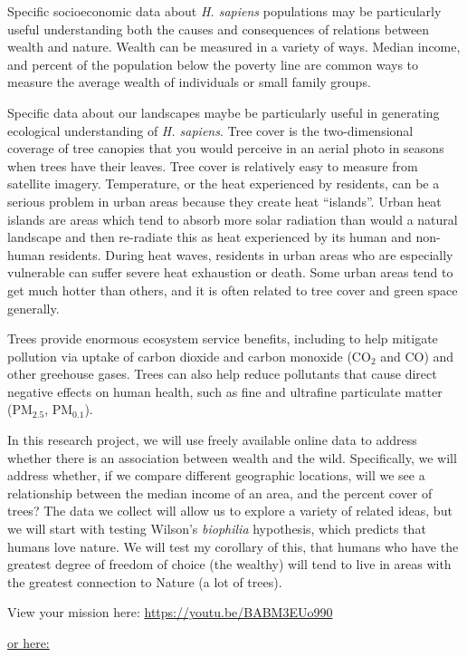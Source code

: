 \documentclass[
  letterpaper,
  DIV=11,
  numbers=noendperiod]{scrreprt}
\begin{document}
Specific socioeconomic data about \emph{H. sapiens} populations may be
particularly useful understanding both the causes and consequences of
relations between wealth and nature. Wealth can be measured in a variety
of ways. Median income, and percent of the population below the poverty
line are common ways to measure the average wealth of individuals or
small family groups.

Specific data about our landscapes maybe be particularly useful in
generating ecological understanding of \emph{H. sapiens}. Tree cover is
the two-dimensional coverage of tree canopies that you would perceive in
an aerial photo in seasons when trees have their leaves. Tree cover is
relatively easy to measure from satellite imagery. Temperature, or the
heat experienced by residents, can be a serious problem in urban areas
because they create heat ``islands''. Urban heat islands are areas which
tend to absorb more solar radiation than would a natural landscape and
then re-radiate this as heat experienced by its human and non-human
residents. During heat waves, residents in urban areas who are
especially vulnerable can suffer severe heat exhaustion or death. Some
urban areas tend to get much hotter than others, and it is often related
to tree cover and green space generally.

Trees provide enormous ecosystem service benefits, including to help
mitigate pollution via uptake of carbon dioxide and carbon monoxide
(CO\(_2\) and CO) and other greehouse gases. Trees can also help reduce
pollutants that cause direct negative effects on human health, such as
fine and ultrafine particulate matter (PM\(_{2.5}\), PM\(_{0.1}\)).

In this research project, we will use freely available online data to
address whether there is an association between wealth and the wild.
Specifically, we will address whether, if we compare different
geographic locations, will we see a relationship between the median
income of an area, and the percent cover of trees? The data we collect
will allow us to explore a variety of related ideas, but we will start
with testing Wilson's \emph{biophilia} hypothesis, which predicts that
humans love nature. We will test my corollary of this, that humans who
have the greatest degree of freedom of choice (the wealthy) will tend to
live in areas with the greatest connection to Nature (a lot of trees).

View your mission here: \url{https://youtu.be/BABM3EUo990}

\href{https://youtu.be/BABM3EUo990}{or here:}
\end{document}
